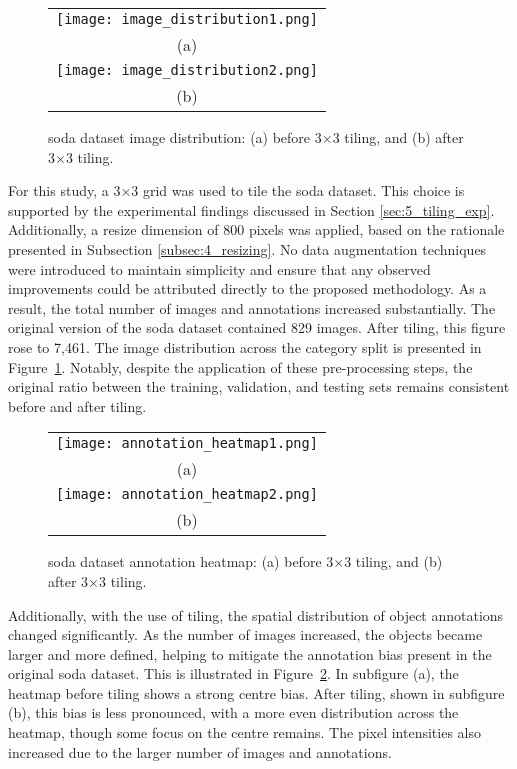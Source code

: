 \begin{figure}[!b]
  \centering
  \begin{tabular}{c}
    \texttt{[image: image\_distribution1.png]} \\
    \small (a) \\
    \addlinespace[1em]
    \texttt{[image: image\_distribution2.png]} \\
    \small (b) \\
  \end{tabular}
  \caption{\gls{soda} dataset image distribution: (a) before 3$\times$3 tiling, and (b) after 3$\times$3 tiling.}
  \label{fig:soda_image_distribution}
\end{figure}
For this study, a 3$\times$3 grid was used to tile the \gls{soda} dataset. This choice is supported by the experimental findings discussed in Section \ref{sec:5_tiling_exp}. Additionally, a resize dimension of 800 pixels was applied, based on the rationale presented in Subsection \ref{subsec:4_resizing}. No data augmentation techniques were introduced to maintain simplicity and ensure that any observed improvements could be attributed directly to the proposed methodology. As a result, the total number of images and annotations increased substantially. The original version of the \gls{soda} dataset contained 829 images. After tiling, this figure rose to 7,461. The image distribution across the category split is presented in Figure~\ref{fig:soda_image_distribution}. Notably, despite the application of these pre-processing steps, the original ratio between the training, validation, and testing sets remains consistent before and after tiling.

\begin{figure}[!b]
  \centering
  \begin{tabular}{c}
    \texttt{[image: annotation\_heatmap1.png]} \\
    \small (a) \\
    \addlinespace[1em]
    \texttt{[image: annotation\_heatmap2.png]} \\
    \small (b) \\
  \end{tabular}
  \caption{\gls{soda} dataset annotation heatmap: (a) before 3$\times$3 tiling, and (b) after 3$\times$3 tiling.}
  \label{fig:soda_annotation_heatmap}
\end{figure}

Additionally, with the use of tiling, the spatial distribution of object annotations changed significantly. As the number of images increased, the objects became larger and more defined, helping to mitigate the annotation bias present in the original \gls{soda} dataset. This is illustrated in Figure~\ref{fig:soda_annotation_heatmap}. In subfigure (a), the heatmap before tiling shows a strong centre bias. After tiling, shown in subfigure (b), this bias is less pronounced, with a more even distribution across the heatmap, though some focus on the centre remains. The pixel intensities also increased due to the larger number of images and annotations.


